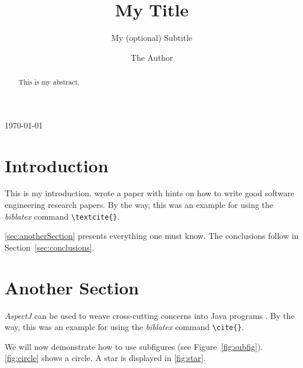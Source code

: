 \documentclass{llncs}
\title{My Title}
\subtitle{My (optional) Subtitle}
\author{The Author}
\institute{Kiel University\\Department of Computer Science\\24098 Kiel, Germany}
\begin{document}
\maketitle
\begin{center}
	\today
\end{center}

\begin{abstract}
  This is my abstract.
\end{abstract}

\section{Introduction}

  This is my introduction. \textcite{Shaw2003WritingGoodSoftwareEngineeringResearchPapersMinitutorial} wrote a paper with hints on how to write good software engineering research papers. By the way, this was an example for using the \textit{biblatex} command \texttt{\textbackslash{}textcite\{\}}.

  \autoref{sec:anotherSection} presents everything one must know. 
  The conclusions follow in Section~\ref{sec:conclusions}.

\section{Another Section}\label{sec:anotherSection}

  \textit{AspectJ} can be used to weave cross-cutting concerns into Java programs \cite{AspectJ2007}. 
  By the way, this was an example for using the \textit{biblatex} command \texttt{\textbackslash{}cite\{\}}.

  We will now demonstrate how to use subfigures (see Figure~\ref{fig:subfig}). \autoref{fig:circle} shows a circle.
  A star is displayed in \autoref{fig:star}.
\end{document}

